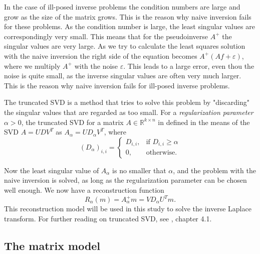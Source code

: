 \documentclass[12pt,a4]{article}
\newcommand{\R}{{\mathbb R}}
\newcommand{\eps}{\varepsilon}
\begin{document}
In the case of ill-posed inverse problems the condition numbers are large and grow as the size of the matrix grows. This is the reason why naive inversion fails for these problems. As the condition number is large, the least singular values are correspondingly very small. This means that for the pseudoinverse $A^+$ the singular values are very large. As we try to calculate the least squares solution with the naive inversion the right side of the equation becomes $A^+ (Af + \eps)$, where we multiply $A^+$ with the noise $\eps$. This leads to a large error, even thou the noise is quite small, as the inverse singular values are often very much larger. This is the reason why naive inversion fails for ill-posed inverse problems.

The truncated SVD is a method that tries to solve this problem by "discarding" the singular values that are regarded as too small. For a \emph{regularization parameter} $\alpha > 0$, the truncated SVD for a matrix $A \in \R^{k \times n}$ in defined in the means of the SVD $A = U D V^T$ as $A_{\alpha} = U D_{\alpha} V^T$, where
\begin{equation}
(D_{\alpha})_{i,i} =
\begin{cases}
D_{i,i}, & \text{if } D_{i,i} \geq \alpha \\
0,       & \text{otherwise}.
\end{cases}
\end{equation}

Now the least singular value of $A_{\alpha}$ is no smaller that $\alpha$, and the problem with the naive inversion is solved, as long as the regularization parameter can be chosen well enough. We now have a reconstruction function
\begin{equation}
R_{\alpha}(m) = A_{\alpha}^+ m = V D_{\alpha} U^T m.
\end{equation}
This reconstruction model will be used in this study to solve the inverse Laplace transform. For further reading on truncated SVD, see \cite{samu}, chapter 4.1.



\subsection{The matrix model}\label{sec:matrixmodel}
\end{document}
